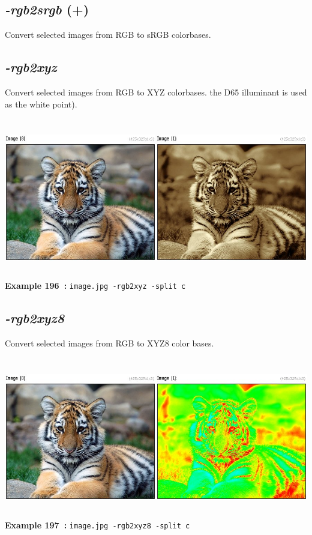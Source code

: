 \documentclass[a4paper,11pt,twoside]{book}
\begin{document}
\subsection{\emph{-rgb2srgb} (+)}\vspace*{-0.5em}
Convert selected images from RGB to sRGB colorbases.


\subsection{\emph{-rgb2xyz} }\vspace*{-0.5em}
Convert selected images from RGB to XYZ colorbases.
the D65 illuminant is used as the white point).
\begin{center}\includegraphics[keepaspectratio=true,height=7cm,width=\textwidth]{img/gmic_def196.jpg}\\
{\footnotesize \textbf{Example 196~:} \texttt{image.jpg -rgb2xyz -split c}}
\end{center}

\subsection{\emph{-rgb2xyz8} }\vspace*{-0.5em}
Convert selected images from RGB to XYZ8 color bases.
\begin{center}\includegraphics[keepaspectratio=true,height=7cm,width=\textwidth]{img/gmic_def197.jpg}\\
{\footnotesize \textbf{Example 197~:} \texttt{image.jpg -rgb2xyz8 -split c}}
\end{center}
\end{document}
